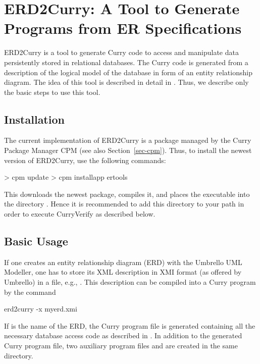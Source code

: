 \section{ERD2Curry: A Tool to Generate Programs from ER Specifications}
\label{sec-erd2curry}

ERD2Curry
is a tool to generate Curry code to access and manipulate data
persistently stored in relational databases.
The Curry code is generated from a description of the logical model
of the database in form of an
entity relationship diagram.
The idea of this tool is described in detail in
\cite{BrasselHanusMueller08PADL}.
Thus, we describe only the basic steps to use this tool.

\subsection{Installation}

The current implementation of ERD2Curry is a package
managed by the Curry Package Manager CPM
(see also Section~\ref{sec-cpm}).
Thus, to install the newest version of ERD2Curry, use the following commands:
%
\begin{curry}
> cpm update
> cpm installapp ertools
\end{curry}
%
This downloads the newest package, compiles it, and places
the executable  into the directory .
Hence it is recommended to add this directory to your path
in order to execute CurryVerify as described below.

\subsection{Basic Usage}

If one creates an entity relationship diagram (ERD)
with the Umbrello UML Modeller, one has to store its
XML description in XMI format (as offered by Umbrello)
in a file, e.g., .
This description can be compiled into a Curry program by the
command
\begin{curry}
erd2curry -x myerd.xmi
\end{curry}
If  is the name of the ERD, the Curry program file
 is generated containing all the necessary
database access code as described in \cite{BrasselHanusMueller08PADL}.
In addition to the generated Curry program file,
two auxiliary program files
 and 
are created in the same directory.

